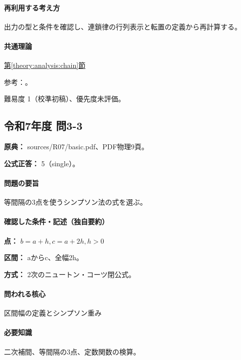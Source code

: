 \paragraph{再利用する考え方} 出力の型と条件を確認し、連鎖律の行列表示と転置の定義から再計算する。

\paragraph{共通理論} \hyperref[theory:analysis:chain]{第\ref*{theory:analysis:chain}節}

\par 参考：\cite{mit_chain2007}。

\par 難易度 1（校準初稿）、優先度未評価。

\subsection{令和7年度 問3-3}
\label{q:r07-reg-basic-3-3}

\noindent\textbf{原典：} sources/R07/basic.pdf、PDF物理9頁。

\textbf{公式正答：} 5（single）。

\paragraph{問題の要旨} 等間隔の3点を使うシンプソン法の式を選ぶ。

\paragraph{確認した条件・記述（独自要約）}\mbox{}\par

\noindent\textbf{点：} \(b=a+h,c=a+2h,h>0\)\par

\noindent\textbf{区間：} aからc、全幅2h。\par

\noindent\textbf{方式：} 2次のニュートン・コーツ閉公式。\par

\paragraph{問われる核心} 区間幅の定義とシンプソン重み

\paragraph{必要知識} 二次補間、等間隔の3点、定数関数の検算。

